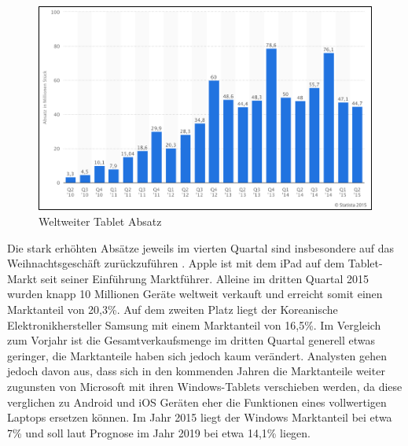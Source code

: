 \documentclass[11pt,a4paper]{report}
\begin{document}
\begin{figure}[h]
\begin{center}
\includegraphics[scale=0.9]{./images/2.png}
\caption{Weltweiter Tablet Absatz \cite{AbsatzvonTablets}}
\label{absatz_markt}
\end{center}
\end{figure}
Die stark erhöhten Absätze jeweils im vierten Quartal sind insbesondere auf das Weihnachtsgeschäft zurückzuführen \cite{AbsatzvonTablets}. Apple ist mit dem iPad auf dem Tablet-Markt seit seiner Einführung Marktführer. Alleine im dritten Quartal 2015 wurden knapp 10 Millionen Geräte weltweit verkauft und erreicht somit einen Marktanteil von 20,3\%. Auf dem zweiten Platz liegt der Koreanische Elektronikhersteller Samsung mit einem Marktanteil von 16,5\%. Im Vergleich zum Vorjahr ist die Gesamtverkaufsmenge im dritten Quartal generell etwas geringer, die Marktanteile haben sich jedoch kaum verändert. \cite{IDCWorldwideQuarterlyTabletTracker} Analysten gehen jedoch davon aus, dass sich in den kommenden Jahren die Marktanteile weiter zugunsten von Microsoft mit ihren Windows-Tablets verschieben werden, da diese verglichen zu Android und iOS Geräten eher die Funktionen eines vollwertigen Laptops ersetzen können. Im Jahr 2015 liegt der Windows Marktanteil bei etwa 7\% und soll laut Prognose im Jahr 2019 bei etwa 14,1\% liegen.
\end{document}
